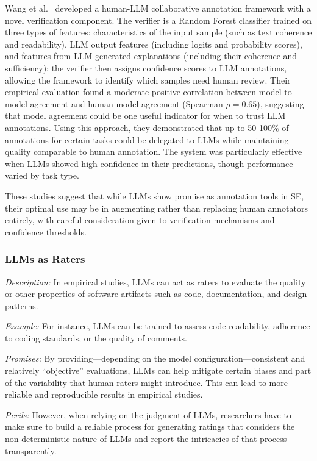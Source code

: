 \documentclass[11pt]{article}
\begin{document}
Wang et al.~\cite{DBLP:conf/chi/Wang0RMM24} developed a human-LLM collaborative annotation framework with a novel verification component. 
The verifier is a Random Forest classifier trained on three types of features: characteristics of the input sample (such as text coherence and readability), LLM output features (including logits and probability scores), and features from LLM-generated explanations (including their coherence and sufficiency); the verifier then assigns confidence scores to LLM annotations, allowing the framework to identify which samples need human review. 
Their empirical evaluation found a moderate positive correlation between model-to-model agreement and human-model agreement (Spearman $\rho = 0.65$), suggesting that model agreement could be one useful indicator for when to trust LLM annotations.
Using this approach, they demonstrated that up to 50-100\% of annotations for certain tasks could be delegated to LLMs while maintaining quality comparable to human annotation. 
The system was particularly effective when LLMs showed high confidence in their predictions, though performance varied by task type.

These studies suggest that while LLMs show promise as annotation tools in SE, their optimal use may be in augmenting rather than replacing human annotators entirely, with careful consideration given to verification mechanisms and confidence thresholds.

\subsubsection{LLMs as Raters}

\emph{Description:} In empirical studies, LLMs can act as raters to evaluate the quality or other properties of software artifacts such as code, documentation, and design patterns.

\emph{Example:}  For instance, LLMs can be trained to assess code readability, adherence to coding standards, or the quality of comments. 

\emph{Promises:} By providing---depending on the model configuration---consistent and relatively ``objective'' evaluations, LLMs can help mitigate certain biases and part of the variability that human raters might introduce. 
This can lead to more reliable and reproducible results in empirical studies.

\emph{Perils:} However, when relying on the judgment of LLMs, researchers have to make sure to build a reliable process for generating ratings that considers the non-deterministic nature of LLMs and report the intricacies of that process transparently.
\end{document}
